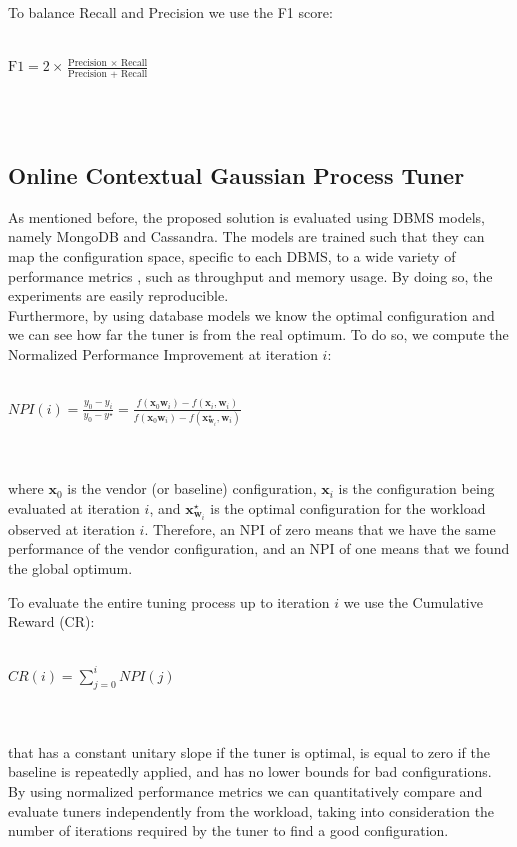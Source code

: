 \documentclass[a4paper, 12pt]{article} %
\begin{document}
	To balance Recall and Precision we use the F1 score:\\\\
	\centerline{
		$
		\text{F1} = 2 \times \frac{ \text{Precision } \times \text{ Recall}}{\text{Precision } + \text{ Recall}}
		$
	}\\\\
	
	\subsection{ Online Contextual Gaussian Process Tuner } \label{ssec:exp_online_cgp}
	As mentioned before, the proposed solution is evaluated using DBMS models, namely MongoDB and Cassandra. The models are trained such that they can map the configuration space, specific to each DBMS, to a wide variety of performance metrics \cite{AkamasCGP}, such as throughput and memory usage. By doing so, the experiments are easily reproducible.\\	
	Furthermore, by using database models we know the optimal configuration and we can see how far the tuner is from the real optimum. To do so, we compute the Normalized Performance Improvement at iteration $i$:\\\\
	\centerline{
	$
	NPI(i) = \frac{y_0 - y_i}{y_0 - y^\star} = \frac{f(\pmb{x}_0 \pmb{w}_i) - f(\pmb{x}_i, \pmb{w}_i)}{f(\pmb{x}_0 \pmb{w}_i) - f(\pmb{x}_{\pmb{w}_i}^\star, \pmb{w}_i)}
	$
	}\\\\
	where $\pmb{x}_0$ is the vendor (or baseline) configuration, $\pmb{x}_i$ is the configuration being evaluated at iteration $i$, and $\pmb{x}_{\pmb{w}_i}^\star$ is the optimal configuration for the workload observed at iteration $i$. Therefore, an NPI of zero means that we have the same performance of the vendor configuration, and an NPI of one means that we found the global optimum. 
	
	To evaluate the entire tuning process up to iteration $i$ we use the Cumulative Reward (CR):\\\\
	\centerline{
		$
		CR(i) = \sum_{j=0}^{i} NPI(j)
		$
	}\\\\
	that has a constant unitary slope if the tuner is optimal, is equal to zero if the baseline is repeatedly applied, and has no lower bounds for bad configurations.\\
	By using normalized performance metrics we can quantitatively compare and evaluate tuners independently from the workload, taking into consideration the number of iterations required by the tuner to find a good configuration.
	
\end{document}
